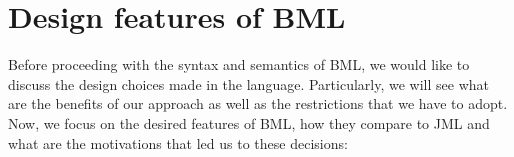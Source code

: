 \section{Design features of BML}\label{BML:design}
Before proceeding with the syntax and semantics 
of BML, we would like to discuss the design choices
 made in the language.
Particularly, we will see what are the benefits of our approach as 
well as the restrictions that we have to adopt.
Now, we focus on the desired features of BML, 
how  they compare to JML and what  are the motivations that led us to these decisions:




